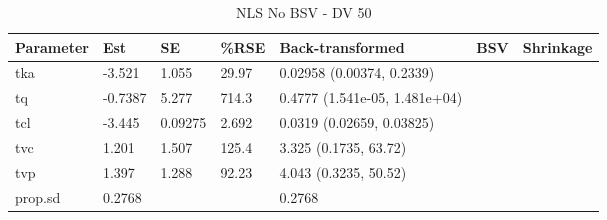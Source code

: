 \begin{table}
\centering\centering
\caption{NLS No BSV - DV 50}
\centering
\fontsize{8}{10}\selectfont
\begin{tabular}[t]{lllllll}
\toprule
\textbf{Parameter} & \textbf{Est} & \textbf{SE} & \textbf{\%RSE} & \textbf{Back-transformed} & \textbf{BSV} & \textbf{Shrinkage}\\
\midrule
tka & -3.521 & 1.055 & 29.97 & 0.02958 (0.00374, 0.2339) &  & \\
\midrule
tq & -0.7387 & 5.277 & 714.3 & 0.4777 (1.541e-05, 1.481e+04) &  & \\
\midrule
tcl & -3.445 & 0.09275 & 2.692 & 0.0319 (0.02659, 0.03825) &  & \\
\midrule
tvc & 1.201 & 1.507 & 125.4 & 3.325 (0.1735, 63.72) &  & \\
\midrule
tvp & 1.397 & 1.288 & 92.23 & 4.043 (0.3235, 50.52) &  & \\
\midrule
prop.sd & 0.2768 &  &  & 0.2768 &  & \\
\bottomrule
\end{tabular}
\end{table}